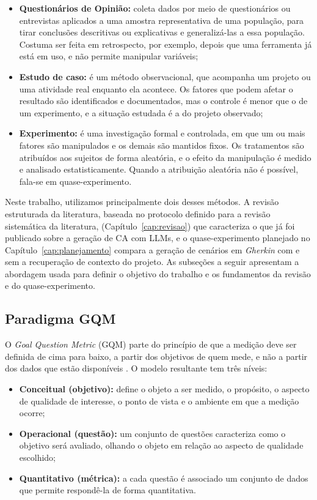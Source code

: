 \begin{itemize}
  \item \textbf{Questionários de Opinião:} coleta dados por meio de questionários ou entrevistas aplicados a uma amostra representativa de uma população, para tirar conclusões descritivas ou explicativas e generalizá-las a essa população. Costuma ser feita em retrospecto, por exemplo, depois que uma ferramenta já está em uso, e não permite manipular variáveis;
  \item \textbf{Estudo de caso:} é um método observacional, que acompanha um projeto ou uma atividade real enquanto ela acontece. Os fatores que podem afetar o resultado são identificados e documentados, mas o controle é menor que o de um experimento, e a situação estudada é a do projeto observado;
  \item \textbf{Experimento:} é uma investigação formal e controlada, em que um ou mais fatores são manipulados e os demais são mantidos fixos. Os tratamentos são atribuídos aos sujeitos de forma aleatória, e o efeito da manipulação é medido e analisado estatisticamente. Quando a atribuição aleatória não é possível, fala-se em quase-experimento.
\end{itemize}

Neste trabalho, utilizamos principalmente dois desses métodos. A revisão estruturada da literatura, baseada no protocolo definido para a revisão sistemática da literatura, (Capítulo~\ref{cap:revisao}) que caracteriza o que já foi publicado sobre a geração de CA com LLMs, e o quase-experimento planejado no Capítulo~\ref{cap:planejamento} compara a geração de cenários em \textit{Gherkin} com e sem a recuperação de contexto do projeto. As subseções a seguir apresentam a abordagem usada para definir o objetivo do trabalho e os fundamentos da revisão e do quase-experimento.

\subsection{Paradigma GQM}
\label{sec:ref-gqm}

O \textit{Goal Question Metric} (GQM) parte do princípio de que a medição deve ser definida de cima para baixo, a partir dos objetivos de quem mede, e não a partir dos dados que estão disponíveis \cite{basili1994}. O modelo resultante tem três níveis:

\begin{itemize}
  \item \textbf{Conceitual (objetivo):} define o objeto a ser medido, o propósito, o aspecto de qualidade de interesse, o ponto de vista e o ambiente em que a medição ocorre;
  \item \textbf{Operacional (questão):} um conjunto de questões caracteriza como o objetivo será avaliado, olhando o objeto em relação ao aspecto de qualidade escolhido;
  \item \textbf{Quantitativo (métrica):} a cada questão é associado um conjunto de dados que permite respondê-la de forma quantitativa.
\end{itemize}

